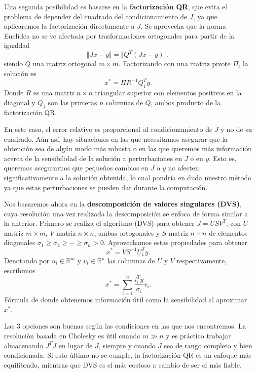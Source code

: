\documentclass[11pt,a4paper]{book}
\theoremstyle{definition}
\theoremstyle{remark}
\begin{document}
Una segunda posibilidad es basarse en la \textbf{factorización QR}, que evita el problema de depender del cuadrado del condicionamiento de $J$, ya que aplicaremos la factorización directamente a $J$. Se aprovecha que la norma Euclídea no se ve afectada por trasformaciones ortogonales para partir de la igualdad
\begin{equation}
	\Vert Jx- y \Vert = \Vert Q^T(Jx-y) \Vert, 
\end{equation}
siendo $Q$ una matriz ortogonal $m \times m$. Factorizando con una matriz pivote $\Pi$, la solución es
\begin{equation}
	x^* = \Pi R^{-1}Q_1^Ty.
\end{equation}
Donde $R$ es una matriz $n \times n$ triangular superior con elementos positivos en la diagonal y $Q_1$ son las primeras $n$ columnas de $Q$, ambos producto de la factorización QR.

En este caso, el error relativo es proporcional al condicionamiento de $J$ y no de su cuadrado. Aún así, hay situaciones en las que necesitamos asegurar que la obtención sea de algún modo más robusta o en las que queremos más información acerca de la sensibilidad de la solución a perturbaciones en $J$ o en $y$. Esto es, queremos asegurarnos que pequeños cambios en $J$ o $y$ no afecten significativamente a la solución obtenida, lo cual pondría en duda nuestro método ya que estas perturbaciones se pueden dar durante la computación.

Nos basaremos ahora en la \textbf{descomposición de valores singulares (DVS)}, cuya resolución una vez realizada la descomposición se enfoca de forma similar a la anterior. Primero se realiza el algoritmo (DVS) para obtener $J = USV^T$, con $U$ matriz $m \times m$, $V$ matriz $n \times n$, ambas ortogonales y $S$ matriz $n \times n$ de elementos diagonales $\sigma_1 \geq \sigma_2 \geq \cdots \geq \sigma_n > 0$. Aprovechamos estas propiedades para obtener
\begin{equation}
	x^* = VS^{-1}U_1^Ty.
\end{equation}
Denotando por $u_i \in \mathbb{R}^m$ y $v_i \in \mathbb{R}^n$ las columnas de $U$ y $V$ respectivamente, escribimos
\begin{equation}
	x^* = \sum_{i=1}^n \frac{i_i^Ty}{\sigma_i}v_i.
\end{equation}
Fórmula de donde obtenemos información útil como la sensibilidad al aproximar $x^*$.

Las 3 opciones son buenas según las condiciones en las que nos encontremos. La resolución basada en Cholesky es útil cuando $m\gg n$ y es práctico trabajar almacenando $J^TJ$ en lugar de $J$, siempre y cuando $J$ sea de rango completo y bien condicionada. Si esto último no se cumple, la factorización QR es un enfoque más equilibrado, mientras que DVS es el más costoso a cambio de ser el más fiable.
\end{document}
